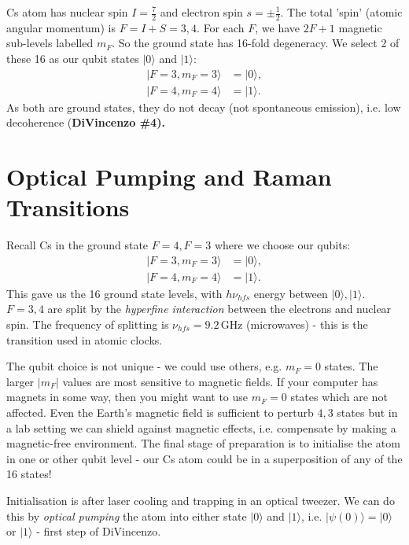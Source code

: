 \documentclass[a4paper, 11pt, normalem]{report}
\begin{document}
Cs atom has nuclear spin $I=\frac72$ and electron spin $s=\pm\frac12$.
The total 'spin' (atomic angular momentum) is $F=I+S=3,4$.
For each $F$, we have $2F+1$ magnetic sub-levels labelled $m_F$.
So the ground state has 16-fold degeneracy.
We select 2 of these 16 as our qubit states $|0\rangle$ and $|1\rangle$:
\begin{align*}
    |F=3,m_F=3\rangle &= |0\rangle, \\
    |F=4,m_F=4\rangle &= |1\rangle.
\end{align*}
As both are ground states, they do not decay (not spontaneous emission), i.e. low decoherence (\textbf{DiVincenzo \#4).}


\chapter{Optical Pumping and Raman Transitions}
Recall Cs in the ground state $F=4,F=3$ where we choose our qubits:
\begin{align*}
    |F=3,m_F=3\rangle &= |0\rangle, \\
    |F=4,m_F=4\rangle &= |1\rangle.
\end{align*}
This gave us the 16 ground state levels, with $h\nu_{hfs}$ energy between $|0\rangle,|1\rangle$.
$F=3,4$ are split by the \emph{hyperfine interaction} between the electrons and nuclear spin.
The frequency of splitting is $\nu_{hfs}=9.2\,$GHz (microwaves) - this is the transition used in atomic clocks.

The qubit choice is not unique - we could use others, e.g. $m_F=0$ states.
The larger $|m_F|$ values are most sensitive to magnetic fields.
If your computer has magnets in some way, then you might want to use $m_F=0$ states which are not affected.
Even the Earth's magnetic field is sufficient to perturb $4,3$ states but in a lab setting we can shield against magnetic effects, i.e. compensate by making a magnetic-free environment.
The final stage of preparation is to initialise the atom in one or other qubit level - our Cs atom could be in a superposition of any of the 16 states!

Initialisation is after laser cooling and trapping in an optical tweezer.
We can do this by \emph{optical pumping} the atom into either state $|0\rangle$ and $|1\rangle$, i.e. $|\psi(0)\rangle=|0\rangle$ or $|1\rangle$ - first step of DiVincenzo.
\end{document}
